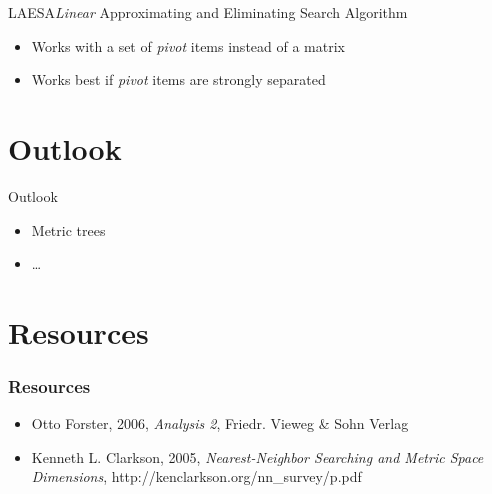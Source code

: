 \documentclass[handout]{beamer}
\begin{document}
\begin{frame}{LAESA}{\textit{Linear} Approximating and Eliminating Search Algorithm}
 \begin{itemize}
  \item Works with a set of \textit{pivot} items instead of a matrix
  \pause
  \item Works best if \textit{pivot} items are strongly separated
 \end{itemize}
\end{frame}

\section{Outlook}
\begin{frame}{Outlook}
 \begin{itemize}
  \item Metric trees
  \item \dots
 \end{itemize}
\end{frame}

\section{Resources}
\begin{frame}
 \frametitle{Resources}
 \begin{itemize}
  \item Otto Forster, 2006, \textit{Analysis 2}, Friedr. Vieweg \& Sohn Verlag
  \item Kenneth L. Clarkson, 2005, \textit{Nearest-Neighbor Searching and Metric Space Dimensions}, http://kenclarkson.org/nn\_survey/p.pdf
  \end{itemize}
\end{frame}
\end{document}
